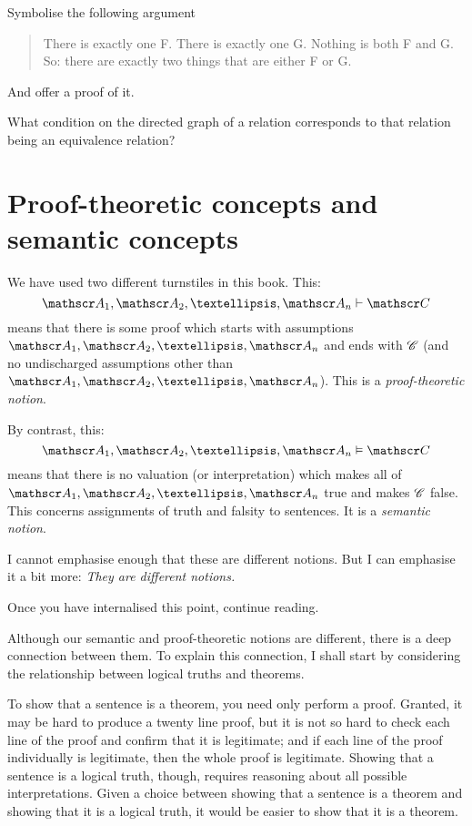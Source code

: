 \problempart
Symbolise the following argument
	\begin{quote}
		There is exactly one F. There is exactly one G. Nothing is both F and G. So: there are exactly two things that are either F or G.
	\end{quote}
And offer a proof of it.

\problempart
What condition on the directed graph of a relation corresponds to that relation being an equivalence relation?

\chapter{Proof-theoretic concepts and semantic concepts}\label{sec:soundcomp}
We have used two different turnstiles in this book.  This:
$$\meta{A}_1, \meta{A}_2, …, \meta{A}_n \proves \meta{C}$$
means that there is some proof which starts with assumptions $\meta{A}_1, \meta{A}_2, …, \meta{A}_n$ and ends with $\mathscr{C}$ (and no undischarged assumptions other than $\meta{A}_1, \meta{A}_2, …, \meta{A}_n$). This is a \emph{proof-theoretic notion}.

By contrast, this:
$$\meta{A}_1, \meta{A}_2, …, \meta{A}_n \entails \meta{C}$$
means that there is no valuation (or interpretation) which makes all of $\meta{A}_1, \meta{A}_2, …, \meta{A}_n$ true and makes $\mathscr{C}$ false. This concerns assignments of truth and falsity to sentences. It is a \emph{semantic notion}.

I cannot emphasise enough that these are different notions. But I can emphasise it a bit more: \emph{They are different notions.}

Once you have internalised this point, continue reading. 

Although our semantic and proof-theoretic notions are different, there is a deep connection between them. To explain this connection, I shall start by considering the relationship between logical truths and theorems.

To show that a sentence is a theorem, you need only perform a proof. Granted, it may be hard to produce a twenty line proof, but it is not so hard to check each line of the proof and confirm that it is legitimate; and if each line of the proof individually is legitimate, then the whole proof is legitimate. Showing that a sentence is a logical truth, though, requires reasoning about all possible interpretations. Given a choice between showing that a sentence is a theorem and showing that it is a logical truth, it would be easier to show that it is a theorem.

